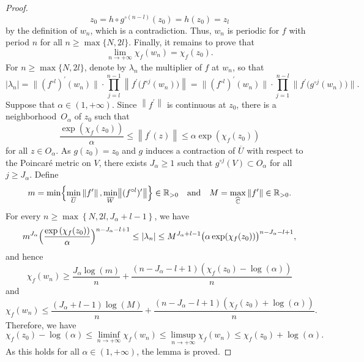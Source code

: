 \documentclass[11pt]{article}
\theoremstyle{plain}
\theoremstyle{definition}
\theoremstyle{remark}
\begin{document}
\begin{proof}
\[
z_{0} = h \circ g^{\circ (n -l)}(z_{0}) = h(z_{0}) = z_{l}
\]
by the definition of $w_{n}$, which is a contradiction. Thus, $w_{n}$ is periodic for $f$ with period $n$ for all $n \geq \max\lbrace N, 2 l \rbrace$. Finally, it remains to prove that
\[
\lim_{n \to +\infty} \chi_{f}(w_{n}) = \chi_{f}(z_{0}).
\]
For $n \geq \max\lbrace N, 2 l \rbrace$, denote by $\lambda_{n}$ the multiplier of $f$ at $w_{n}$, so that
\[
\left\lvert \lambda_{n} \right\rvert = \bigl\lVert(f^{\circ l})^{\prime}(w_{n}) \bigr\rVert \cdot \prod_{j = l}^{n -1} \left\lVert f^{\prime}\bigl(f^{\circ j}(w_{n}) \bigr) \right\rVert = \bigl\lVert(f^{\circ l})^{\prime}(w_{n}) \bigr\rVert \cdot \prod_{j = 1}^{n -l} \bigl\lVert f^{\prime}\bigl(g^{\circ j}(w_{n}) \bigr) \bigr\rVert.
\]
Suppose that $\alpha \in (1, +\infty)$. Since $\left\lVert f^{\prime} \right\rVert$ is continuous at $z_{0}$, there is a neighborhood~$O_{\alpha}$ of $z_{0}$ such that
\[
\frac{\exp\left(\chi_{f}(z_{0}) \right)}{\alpha} \leq \left\lVert f^{\prime}(z) \right\rVert \leq \alpha \exp\left(\chi_{f}(z_{0}) \right)
\]
for all $z \in O_{\alpha}$. As $g(z_{0}) = z_{0}$ and $g$ induces a contraction of $\overline{U}$ with respect to the Poincaré metric on $V$, there exists $J_{\alpha} \geq 1$ such that $g^{\circ j}(V) \subset O_{\alpha}$ for all $j \geq J_{\alpha}$. Define
\[
m = \min\Bigl\lbrace \min_{\overline{U}} \left\lVert f^{\prime} \right\rVert, \min_{\overline{W}} \bigl\lVert(f^{\circ l})^{\prime} \bigr\rVert \Bigr\rbrace \in \mathbb{R}_{> 0} \quad \text{and} \quad M = \max_{\widehat{\mathbb{C}}} \left\lVert f^{\prime} \right\rVert \in \mathbb{R}_{> 0}.
\]
For every $n \geq \max\left\lbrace N, 2 l, J_{\alpha} +l -1 \right\rbrace$, we have
\[
m^{J_{\alpha}} \Bigl(\frac{\exp\left(\chi_{f}(z_{0}) \right)}{\alpha} \Bigr)^{n -J_{\alpha} -l +1} \leq \left\lvert \lambda_{n} \right\rvert \leq M^{J_{\alpha} +l -1} \bigl(\alpha \exp(\chi_{f}(z_{0})) \bigr)^{n -J_{\alpha} -l +1},
\]
and hence
\[
\chi_{f}(w_{n}) \geq \frac{J_{\alpha} \log(m)}{n} +\frac{\left(n -J_{\alpha} -l +1 \right) \left(\chi_{f}(z_{0}) -\log(\alpha) \right)}{n}
\]
and
\[
\chi_{f}(w_{n}) \leq \frac{\left(J_{\alpha} +l -1 \right) \log(M)}{n} +\frac{\left(n -J_{\alpha} -l +1 \right) \left(\chi_{f}(z_{0}) +\log(\alpha) \right)}{n}.
\]
Therefore, we have
\[
\chi_{f}(z_{0}) -\log(\alpha) \leq \liminf_{n \to +\infty} \chi_{f}(w_{n}) \leq \limsup_{n \to +\infty} \chi_{f}(w_{n}) \leq \chi_{f}(z_{0}) +\log(\alpha).
\]
As this holds for all $\alpha \in (1, +\infty)$, the lemma is proved.
\end{proof}
\end{document}
